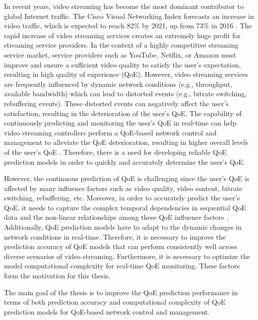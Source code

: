 In recent years, video streaming has become the most dominant contributor to global Internet traffic.
The Cisco Visual Networking Index forecasts an increase in video traffic, which is expected to reach 82\% by 2021, up from 73\% in 2016 \citep{CiscoIndex}.
The rapid increase of video streaming services creates an extremely huge profit for streaming service providers.
In the context of a highly competitive streaming service market, service providers such as YouTube, Netflix, or Amazon must improve and ensure a sufficient video quality to satisfy the user's expectation, resulting in high quality of experience (QoE).
However, video streaming services are frequently influenced by dynamic network conditions (e.g., throughput, available bandwidth) which can lead to distorted events (e.g., bitrate switching, rebuffering events).
These distorted events can negatively affect the user's satisfaction, resulting in the deterioration of the user's QoE.
The capability of continuously predicting and monitoring the user's QoE in real-time can help video streaming controllers perform a QoE-based network control and management to alleviate the QoE deterioration, resulting in higher overall levels of the user's QoE \citep{QABR_Chanh, QABR_DeepQ}.
Therefore, there is a need for developing reliable QoE prediction models in order to quickly and accurately determine the user's QoE.


However, the continuous prediction of QoE is challenging since the user's QoE is affected by many influence factors such as video quality, video content, bitrate switching, rebuffering, etc.
Moreover, in order to accurately predict the user's QoE, it needs to capture the complex temporal dependencies in sequential QoE data and the non-linear relationships among these QoE influence factors  \citep{EffectSizesOfInfluenceFactors, QoEModel_TimeVaryingSubjectiveQuality, QoEModel_TVQoE_ContinuousTimeQoE, NetflixQoE}.
Additionally, QoE prediction models have to adapt to the dynamic changes in network conditions in real-time.
Therefore, it is necessary to improve the prediction accuracy of QoE models that can perform consistently well across diverse scenarios of video streaming.
Furthermore, it is necessary to optimize the model computational complexity for real-time QoE monitoring.
These factors form the motivation for this thesis.


The main goal of the thesis is to improve the QoE prediction performance in terms of both prediction accuracy and computational complexity of QoE prediction models for QoE-based network control and management.